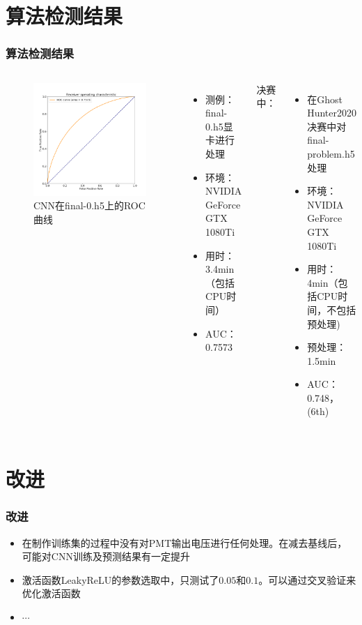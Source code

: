 \documentclass{beamer}
\begin{document}
\section{算法检测结果}
\begin{frame}
\frametitle{算法检测结果}
\begin{columns}
\begin{figure}[H]
    \centering
    \includegraphics[width=1.0\linewidth]{ROC.png}
    \caption{CNN在final-0.h5上的ROC曲线}
\end{figure}
\begin{itemize}
    \item 测例：final-0.h5显卡进行处理
    \item 环境：NVIDIA GeForce GTX 1080Ti
    \item 用时：3.4min（包括CPU时间）
    \item AUC：0.7573
\end{itemize}
决赛中：
\begin{itemize}
    \item 在Ghost Hunter2020决赛中对final-problem.h5处理
    \item 环境：NVIDIA GeForce GTX 1080Ti
    \item 用时：4min（包括CPU时间，不包括预处理)
    \item 预处理：1.5min
    \item AUC：0.748，(6th)
\end{itemize}
\end{columns}
\end{frame}

\section{改进}
\begin{frame}
\frametitle{改进}
\begin{itemize}
    \item 在制作训练集的过程中没有对PMT输出电压进行任何处理。在减去基线后，可能对CNN训练及预测结果有一定提升
    \item 激活函数LeakyReLU的参数选取中，只测试了$0.05$和$0.1$。可以通过交叉验证来优化激活函数
    \item $\cdots$
\end{itemize}
\end{frame}
\end{document}
